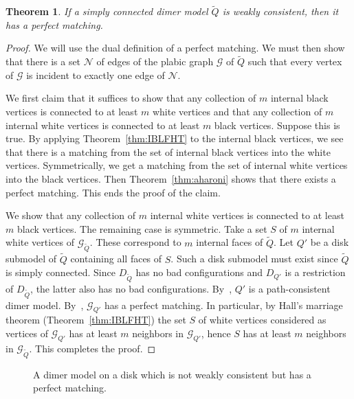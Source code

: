 \documentclass{article}
\newtheorem{thm}{Theorem}[section]
\theoremstyle{definition}
\begin{document}
\begin{thm}\label{thm:geo-consistent-then-almost-perfect-matching}
	If a simply connected dimer model $\widetilde Q$ is weakly consistent, then it has a perfect matching.
\end{thm}

\begin{proof}
	We will use the dual definition of a perfect matching. We must then show that there is a set $\mathcal N$ of edges of the plabic graph $\mathcal G$ of $\widetilde Q$ such that every vertex of $\mathcal G$ is incident to exactly one edge of $\mathcal N$.





	We first claim that it suffices to show that any collection of $m$ internal black vertices is connected to at least $m$ white vertices and that any collection of $m$ internal white vertices is connected to at least $m$ black vertices. 
	Suppose this is true. 
		By applying Theorem~\ref{thm:IBLFHT} to the internal black vertices, we see that there is a matching from the set of internal black vertices into the white vertices. Symmetrically, we get a matching from the set of internal white vertices into the black vertices. Then Theorem~\ref{thm:aharoni} shows that there exists a perfect matching. This ends the proof of the claim.


		We show that any collection of $m$ internal white vertices is connected to at least $m$ black vertices. The remaining case is symmetric. 
		Take a set $S$ of $m$ internal white vertices of $\mathcal G_{\widetilde Q}$. These correspond to $m$ internal faces of $\widetilde Q$. Let $Q'$ be a disk submodel of $\widetilde Q$ containing all faces of $S$. Such a disk submodel must exist since $\widetilde Q$ is simply connected. Since $D_{\widetilde Q}$ has no bad configurations and $D_{Q'}$ is a restriction of $D_{\widetilde Q}$, the latter also has no bad configurations. By~\cite[Proposition 2.15]{CKP}, $Q'$ is a path-consistent dimer model. By~\cite[Corollary 4.6]{CKP}, $\mathcal G_{Q'}$ has a perfect matching. In particular, by Hall's marriage theorem (Theorem~\ref{thm:IBLFHT})
 the set $S$ of white vertices considered as vertices of $\mathcal G_{Q'}$ has at least $m$ neighbors in $\mathcal G_{Q'}$, hence $S$ has at least $m$ neighbors in $\mathcal G_{\widetilde Q}$. This completes the proof.
\end{proof}

\def\svgwidth{70pt}
\begin{figure}
	\centering
	
	\caption{A dimer model on a disk which is not weakly consistent but has a perfect matching.}
	\label{fig:perf-match-not-cons}
\end{figure}
\end{document}
